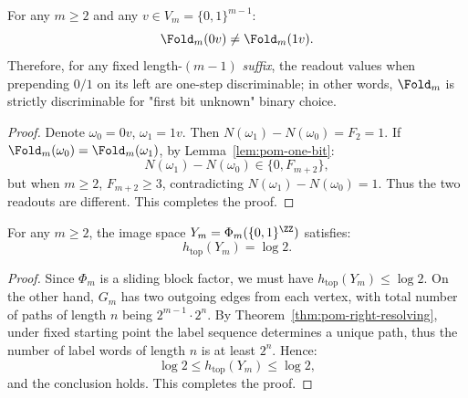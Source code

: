 \begin{theorem}\label{thm:pom-left-resolving}
For any $m\ge 2$ and any $v\in V_m=\{0,1\}^{m-1}$:
\[
\Fold_m(0v)\neq \Fold_m(1v).
\]
Therefore, for any fixed length-$(m-1)$ \emph{suffix}, the readout values when prepending $0/1$ on its left are one-step discriminable; in other words, $\Fold_m$ is strictly discriminable for "first bit unknown" binary choice.
\end{theorem}
\begin{proof}
Denote $\omega_0=0v$, $\omega_1=1v$. Then $N(\omega_1)-N(\omega_0)=F_2=1$.
If $\Fold_m(\omega_0)=\Fold_m(\omega_1)$, by Lemma~\ref{lem:pom-one-bit}:
\[
N(\omega_1)-N(\omega_0)\in\{0,F_{m+2}\},
\]
but when $m\ge 2$, $F_{m+2}\ge 3$, contradicting $N(\omega_1)-N(\omega_0)=1$. Thus the two readouts are different. This completes the proof.
\end{proof}

\begin{theorem}\label{thm:pom-entropy-saturation}
For any $m\ge 2$, the image space $Y_m=\Phi_m(\{0,1\}^{\ZZ})$ satisfies:
\[
h_{\mathrm{top}}(Y_m)=\log 2.
\]
\end{theorem}
\begin{proof}
Since $\Phi_m$ is a sliding block factor, we must have $h_{\mathrm{top}}(Y_m)\le \log 2$. On the other hand, $G_m$ has two outgoing edges from each vertex, with total number of paths of length $n$ being $2^{m-1}\cdot 2^{n}$. By Theorem~\ref{thm:pom-right-resolving}, under fixed starting point the label sequence determines a unique path, thus the number of label words of length $n$ is at least $2^{n}$. Hence:
\[
\log 2\le h_{\mathrm{top}}(Y_m)\le \log 2,
\]
and the conclusion holds. This completes the proof.
\end{proof}

